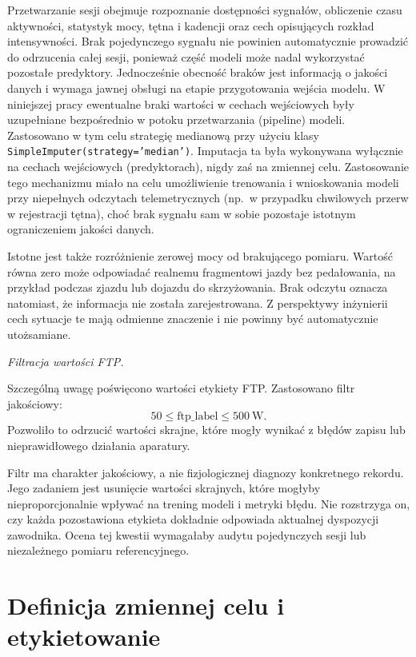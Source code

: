 Przetwarzanie sesji obejmuje rozpoznanie dostępności sygnałów, obliczenie czasu aktywności, statystyk mocy, tętna i kadencji oraz cech opisujących rozkład intensywności. Brak pojedynczego sygnału nie powinien automatycznie prowadzić do odrzucenia całej sesji, ponieważ część modeli może nadal wykorzystać pozostałe predyktory. Jednocześnie obecność braków jest informacją o jakości danych i wymaga jawnej obsługi na etapie przygotowania wejścia modelu. W niniejszej pracy ewentualne braki wartości w cechach wejściowych były uzupełniane bezpośrednio w potoku przetwarzania (pipeline) modeli. Zastosowano w tym celu strategię medianową przy użyciu klasy \texttt{SimpleImputer(strategy='median')}. Imputacja ta była wykonywana wyłącznie na cechach wejściowych (predyktorach), nigdy zaś na zmiennej celu. Zastosowanie tego mechanizmu miało na celu umożliwienie trenowania i wnioskowania modeli przy niepełnych odczytach telemetrycznych (np.\ w przypadku chwilowych przerw w rejestracji tętna), choć brak sygnału sam w sobie pozostaje istotnym ograniczeniem jakości danych.

Istotne jest także rozróżnienie zerowej mocy od brakującego pomiaru. Wartość równa zero może odpowiadać realnemu fragmentowi jazdy bez pedałowania, na przykład podczas zjazdu lub dojazdu do skrzyżowania. Brak odczytu oznacza natomiast, że informacja nie została zarejestrowana. Z perspektywy inżynierii cech sytuacje te mają odmienne znaczenie i nie powinny być automatycznie utożsamiane.

\par\medskip
\noindent\textit{Filtracja wartości FTP.}

Szczególną uwagę poświęcono wartości etykiety FTP. Zastosowano filtr jakościowy:
\begin{equation}
50 \le \mathrm{ftp\_label} \le 500\ \mathrm{W}.
\end{equation}
Pozwoliło to odrzucić wartości skrajne, które mogły wynikać z błędów zapisu lub nieprawidłowego działania aparatury.

Filtr ma charakter jakościowy, a nie fizjologicznej diagnozy konkretnego rekordu. Jego zadaniem jest usunięcie wartości skrajnych, które mogłyby nieproporcjonalnie wpływać na trening modeli i metryki błędu. Nie rozstrzyga on, czy każda pozostawiona etykieta dokładnie odpowiada aktualnej dyspozycji zawodnika. Ocena tej kwestii wymagałaby audytu pojedynczych sesji lub niezależnego pomiaru referencyjnego.

\section{Definicja zmiennej celu i etykietowanie}

